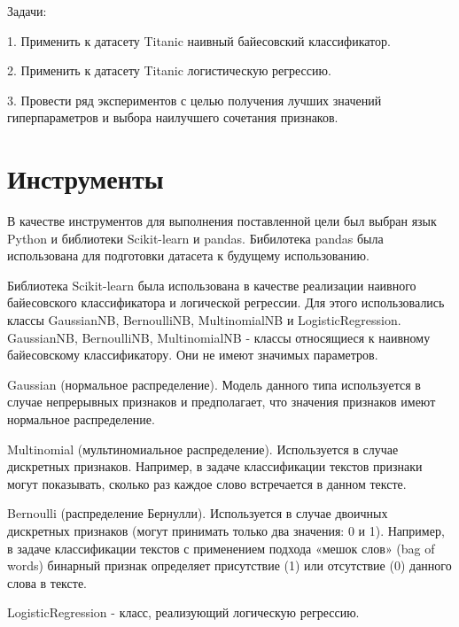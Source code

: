 \documentclass[a4paper,12pt]{article}
\begin{document}
	\vspace{0.5cm}
	Задачи: 
	
	\vspace{0.5cm}
	1. Применить к датасету Titanic наивный байесовский классификатор.
	
	\vspace{0.5cm}
	2. Применить к датасету Titanic логистическую регрессию.

	\vspace{0.5cm}
	3. Провести ряд экспериментов с целью получения лучших значений гиперпараметров и выбора наилучшего сочетания признаков.
	
\newpage\section{Инструменты} 
	В качестве инструментов для выполнения поставленной цели был выбран язык Python и библиотеки Scikit-learn и pandas.
	Бибилотека pandas была использована для подготовки датасета к будущему использованию.
	
	\vspace{0.5cm}
	Библиотека Scikit-learn была использована  в качестве реализации наивного байесовского классификатора и логической регрессии. Для этого использовались классы GaussianNB, BernoulliNB, MultinomialNB и LogisticRegression. GaussianNB, BernoulliNB, MultinomialNB - классы относящиеся к наивному байесовскому классификатору. Они не имеют значимых параметров.
	
	\vspace{0.5cm}
	Gaussian (нормальное распределение). Модель данного типа используется в случае непрерывных признаков и предполагает, что значения признаков имеют нормальное распределение.
	
	\vspace{0.5cm}
	Multinomial (мультиномиальное распределение). Используется в случае дискретных признаков. Например, в задаче классификации текстов признаки могут показывать, сколько раз каждое слово встречается в данном тексте.
	
	\vspace{0.5cm}
	Bernoulli (распределение Бернулли). Используется в случае двоичных дискретных признаков (могут принимать только два значения: 0 и 1). Например, в задаче классификации текстов с применением подхода «мешок слов» (bag of words) бинарный признак определяет присутствие (1) или отсутствие (0) данного слова в тексте.
	
	\vspace{0.5cm}
	LogisticRegression - класс, реализующий логическую регрессию.
	
\end{document}
